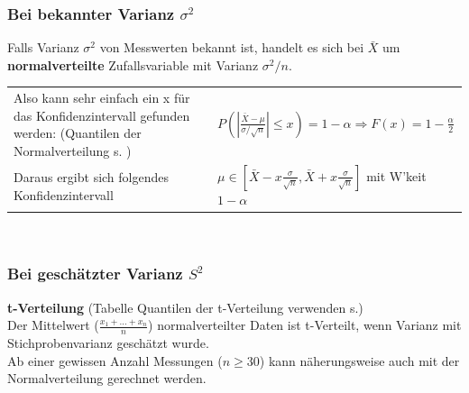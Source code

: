	   
\subsubsection{Bei bekannter Varianz $\sigma^2$}
Falls Varianz $\sigma^2$ von Messwerten bekannt ist, handelt es sich bei $\bar{X}$ um \textbf{normalverteilte} Zufallsvariable mit Varianz $\sigma^2/n$. \\
\begin{tabular}{p{}p{}}
	Also kann sehr einfach ein x für das Konfidenzintervall gefunden werden: (Quantilen der Normalverteilung s. \pageref{tabelle-quantilen-normalverteilung})
	&$P\left(\left|\frac{\bar{X}-\mu}{\sigma / \sqrt{n}}\right|\leq x\right) = 1 - \alpha \Rightarrow F(x) = 1- \frac{\alpha}{2}$\\
	Daraus ergibt sich folgendes Konfidenzintervall
	&$\mu\in\left[\bar{X}-x\frac{\sigma}{\sqrt{n}},\bar{X}+x\frac{\sigma}{\sqrt{n}}\right]$ mit W'keit $1-\alpha$\\
\end{tabular}\\
    
\subsubsection{Bei geschätzter Varianz $S^2$}
\textbf{t-Verteilung} (Tabelle Quantilen der t-Verteilung verwenden s.\pageref{tabelle-quantilen-tvert})\\
Der Mittelwert ($\frac{x_1+\ldots+x_n}{n}$) normalverteilter Daten ist
t-Verteilt, wenn Varianz mit Stichprobenvarianz geschätzt wurde.\\
Ab einer gewissen Anzahl Messungen ($n \geq 30$) kann näherungsweise auch mit
der Normalverteilung gerechnet werden.  \\
    
